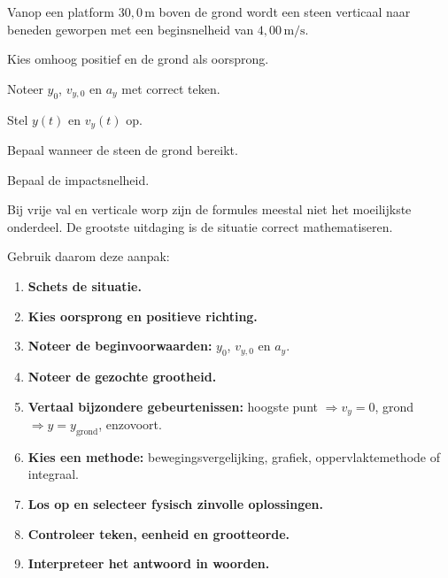 \documentclass{ximera}
\begin{document}
\begin{oefening}{\oefB\ESS}

Vanop een platform $30,0\,\mathrm{m}$ boven de grond wordt een steen
verticaal naar beneden geworpen met een beginsnelheid van
$4,00\,\mathrm{m/s}$.

Kies omhoog positief en de grond als oorsprong.

\begin{question}
Noteer $y_0$, $v_{y,0}$ en $a_y$ met correct teken.
\end{question}

\begin{question}
Stel $y(t)$ en $v_y(t)$ op.
\end{question}

\begin{question}
Bepaal wanneer de steen de grond bereikt.
\end{question}

\begin{question}
Bepaal de impactsnelheid.
\end{question}

\end{oefening}




Bij vrije val en verticale worp zijn de formules meestal niet het
moeilijkste onderdeel. De grootste uitdaging is de situatie correct
mathematiseren.

Gebruik daarom deze aanpak:

\begin{enumerate}
  \item \textbf{Schets de situatie.}
  \item \textbf{Kies oorsprong en positieve richting.}
  \item \textbf{Noteer de beginvoorwaarden:} $y_0$, $v_{y,0}$ en $a_y$.
  \item \textbf{Noteer de gezochte grootheid.}
  \item \textbf{Vertaal bijzondere gebeurtenissen:}
        hoogste punt $\Rightarrow v_y=0$,
        grond $\Rightarrow y=y_{\mathrm{grond}}$, enzovoort.
  \item \textbf{Kies een methode:} bewegingsvergelijking, grafiek,
        oppervlaktemethode of integraal.
  \item \textbf{Los op en selecteer fysisch zinvolle oplossingen.}
  \item \textbf{Controleer teken, eenheid en grootteorde.}
  \item \textbf{Interpreteer het antwoord in woorden.}
\end{enumerate}
\end{document}
